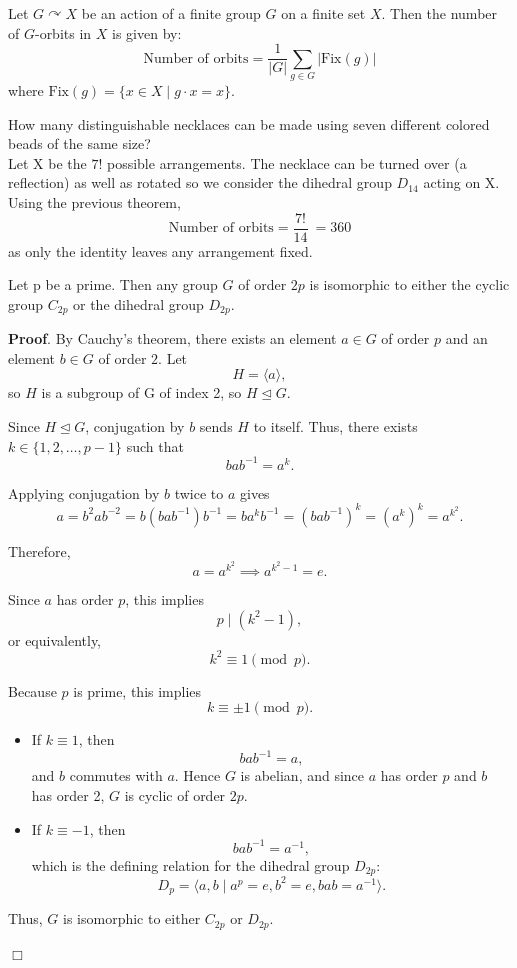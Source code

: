 \documentclass[../main.tex]{subfiles}
\begin{document}
\begin{theorem}[]
\label{}
Let \( G \curvearrowright X \) be an action of a finite group \( G \) on a finite set \( X \).  
Then the number of \( G \)-orbits in \( X \) is given by:
\[
\text{Number of orbits} = \frac{1}{|G|} \sum_{g \in G} |\mathrm{Fix}(g)|
\]
where \( \mathrm{Fix}(g) = \{ x \in X \mid g \cdot x = x \} \).
\end{theorem}

\begin{example}\cite{fraleigh}
How many distinguishable necklaces can be made using seven different colored beads of the same size?\\
    Let X be the $7!$ possible arrangements. The necklace can be turned over (a reflection) as well as rotated so we consider the dihedral group $D_{14}$ acting on X. Using the previous theorem, 
\[
\text{Number of orbits} = \frac{7!}{14}\ = 360
\]
as only the identity leaves any arrangement fixed.
\end{example}

\begin{theorem}
Let p be a prime. Then any group $G$ of order $2p$ is isomorphic to either the cyclic group $C_{2p}$ or the dihedral group $D_{2p}$.

\textbf{Proof}.  
By Cauchy's theorem, there exists an element \( a \in G \) of order $p$ and an element \( b \in G \) of order $2$. Let
\[
H = \langle a \rangle,
\]
so \( H \) is a subgroup of G of index 2, so \( H \trianglelefteq G \).

Since \( H \trianglelefteq G \), conjugation by \( b \) sends \( H \) to itself. Thus, there exists \( k \in \{1, 2, \ldots, p-1\} \) such that
\[
b a b^{-1} = a^k.
\]

Applying conjugation by \( b \) twice to \( a \) gives
\[
a = b^2 a b^{-2} = b (b a b^{-1}) b^{-1} = b a^k b^{-1} = (b a b^{-1})^k = (a^k)^k = a^{k^2}.
\]

Therefore,
\[
a = a^{k^2} \implies a^{k^2 - 1} = e.
\]

Since \( a \) has order \( p \), this implies
\[
p \mid (k^2 - 1),
\]
or equivalently,
\[
k^2 \equiv 1 \pmod p.
\]

Because \( p \) is prime, this implies
\[
k \equiv \pm 1 \pmod p.
\]

\begin{itemize}
\item If \( k \equiv 1 \), then
\[
b a b^{-1} = a,
\]
and \( b \) commutes with \( a \). Hence \( G \) is abelian, and since \( a \) has order \( p \) and \( b \) has order 2, \( G \) is cyclic of order \( 2p \).

\item If \( k \equiv -1 \), then
\[
b a b^{-1} = a^{-1},
\]
which is the defining relation for the dihedral group \( D_{2p} \):
\[
D_p = \langle a, b \mid a^p = e, b^2 = e, b a b = a^{-1} \rangle.
\]
\end{itemize}

Thus, \( G \) is isomorphic to either \( C_{2p} \) or \( D_{2p} \).

\hfill\(\Box\)
\end{theorem}
\end{document}
